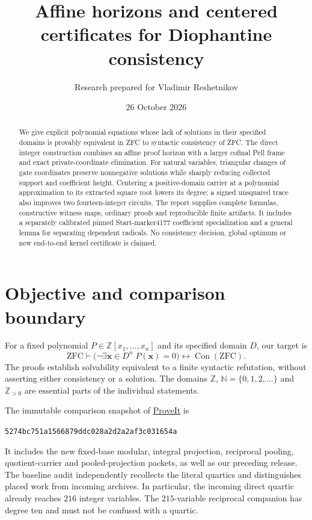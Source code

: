 \documentclass[11pt]{article}
\title{Affine horizons and centered certificates for Diophantine consistency}
\author{Research prepared for Vladimir Reshetnikov}
\date{26 October 2026}
\theoremstyle{definition}\newtheorem{definition}[theorem]{Definition}
\theoremstyle{remark}\newtheorem{remark}[theorem]{Remark}
\newcommand{\Z}{\mathbb Z}\newcommand{\N}{\mathbb N}
\newcommand{\Con}{\operatorname{Con}}
\begin{document}
\maketitle
\begin{abstract}
We give explicit polynomial equations whose lack of solutions in their
specified domains is provably equivalent in ZFC to syntactic consistency
of ZFC. The direct integer construction combines an affine proof horizon
with a larger cofinal Pell frame and exact private-coordinate elimination.
For natural variables, triangular changes of gate coordinates preserve
nonnegative solutions while sharply reducing collected support and
coefficient height. Centering a positive-domain carrier at a polynomial
approximation to its extracted square root lowers its degree; a signed
unsquared trace also improves two fourteen-integer circuits.
The report supplies complete formulas, constructive witness maps,
ordinary proofs and reproducible finite artifacts. It includes a separately
calibrated pinned Start-marker4177 coefficient specialization and a general
lemma for separating dependent radicals. No consistency decision, global
optimum or new end-to-end kernel certificate is claimed.
\end{abstract}
\tableofcontents
\section{Objective and comparison boundary}
For a fixed polynomial $P\in\Z[x_1,\ldots,x_n]$ and its specified domain $D$,
our target is
\[
\mathrm{ZFC}\vdash
\bigl(\neg\exists\boldsymbol{x}\in D^n\;P(\boldsymbol{x})=0\bigr)
\longleftrightarrow\Con(\mathrm{ZFC}).
\]
The proofs establish solvability equivalent to a finite syntactic
refutation, without asserting either consistency or a solution.
The domains $\Z$, $\N=\{0,1,2,\ldots\}$ and $\Z_{>0}$ are essential
parts of the individual statements.

The immutable comparison snapshot of
\href{https://github.com/VladimirReshetnikov/ProveIt}{ProveIt} is
\begin{center}\small\texttt{5274bc751a1566879ddc028a2d2a2af3c031654a}\end{center}
It includes the new fixed-base modular, integral projection, reciprocal
pooling, quotient-carrier and pooled-projection packets, as well as our
preceding release. The baseline audit independently recollects the literal
quartics and distinguishes placed work from incoming archives.
In particular, the incoming direct quartic already reaches $216$ integer
variables. The $215$-variable reciprocal companion has degree ten and must
not be confused with a quartic.
\end{document}
